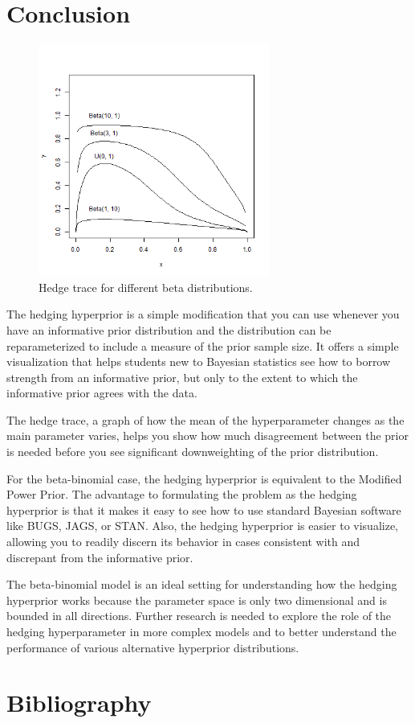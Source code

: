 \documentclass[12pt]{article}
\begin{document}
\section{Conclusion}\begin{figure}
\begin{center}
\includegraphics[width=3in]{fig10.png}
\end{center}
\caption{Hedge trace for different beta distributions. \label{fig:hedge_trace}}
\end{figure}

\label{sec:conc}

The hedging hyperprior is a simple modification that you can use whenever you have an informative prior distribution and the distribution can be reparameterized to include a measure of the prior sample size. It offers a simple visualization that helps students new to Bayesian statistics see how to borrow strength from an informative prior, but only to the extent to which the informative prior agrees with the data.

The hedge trace, a graph of how the mean of the hyperparameter changes as the main parameter varies, helps you show how much disagreement between the prior is needed before you see significant downweighting of the prior distribution.

For the beta-binomial case, the hedging hyperprior is equivalent to the Modified Power Prior. The advantage to formulating the problem as the hedging hyperprior is that it makes it easy to see how to use standard Bayesian software like BUGS, JAGS, or STAN. Also, the hedging hyperprior is easier to visualize, allowing you to readily discern its behavior in cases consistent with and discrepant from the informative prior.

The beta-binomial model is an ideal setting for understanding how the hedging hyperprior works because the parameter space is only two dimensional and is bounded in all directions. Further research is needed to explore the role of the hedging hyperparameter in more complex models and to better understand the performance of various alternative hyperprior distributions.

\section{Bibliography}




\end{document}
